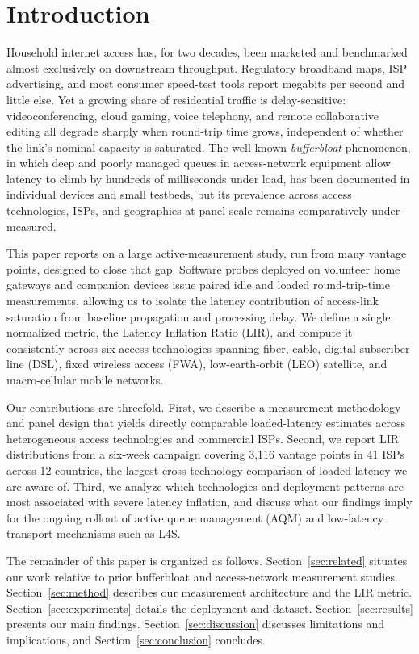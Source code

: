 \section{Introduction}
Household internet access has, for two decades, been marketed and benchmarked almost
exclusively on downstream throughput. Regulatory broadband maps, ISP advertising, and
most consumer speed-test tools report megabits per second and little else. Yet a growing
share of residential traffic is delay-sensitive: videoconferencing, cloud gaming, voice
telephony, and remote collaborative editing all degrade sharply when round-trip time
grows, independent of whether the link's nominal capacity is saturated. The well-known
\emph{bufferbloat} phenomenon, in which deep and poorly managed queues in access-network
equipment allow latency to climb by hundreds of milliseconds under load, has been
documented in individual devices and small testbeds, but its prevalence across access
technologies, ISPs, and geographies at panel scale remains comparatively under-measured.

This paper reports on a large active-measurement study, run from many vantage points, designed to close
that gap. Software probes deployed on volunteer home gateways and companion devices
issue paired idle and loaded round-trip-time measurements, allowing us to isolate the
latency contribution of access-link saturation from baseline propagation and processing
delay. We define a single normalized metric, the Latency Inflation Ratio (LIR), and
compute it consistently across six access technologies spanning fiber, cable, digital
subscriber line (DSL), fixed wireless access (FWA), low-earth-orbit (LEO) satellite, and
macro-cellular mobile networks.

Our contributions are threefold. First, we describe a measurement methodology and
panel design that yields directly comparable loaded-latency estimates across
heterogeneous access technologies and commercial ISPs. Second, we report LIR
distributions from a six-week campaign covering 3{,}116 vantage points in 41 ISPs
across 12 countries, the largest cross-technology comparison of loaded latency we are
aware of. Third, we analyze which technologies and deployment patterns are most
associated with severe latency inflation, and discuss what our findings imply for the
ongoing rollout of active queue management (AQM) and low-latency transport mechanisms
such as L4S.

The remainder of this paper is organized as follows. Section~\ref{sec:related} situates
our work relative to prior bufferbloat and access-network measurement studies.
Section~\ref{sec:method} describes our measurement architecture and the LIR metric.
Section~\ref{sec:experiments} details the deployment and dataset. Section~\ref{sec:results}
presents our main findings. Section~\ref{sec:discussion} discusses limitations and
implications, and Section~\ref{sec:conclusion} concludes.
